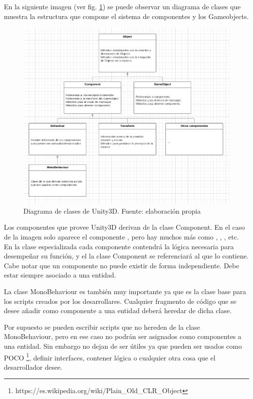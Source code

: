 En la siguiente imagen (ver fig. \ref{diagramaClasesUnity}) se puede observar un diagrama de clases que muestra la estructura que compone el sistema de componentes y los Gameobjects.

\begin{figure}
\begin{center}
\includegraphics[scale=0.8]{imagenes/diagramaClasesUnity.png}
\caption{Diagrama de clases de Unity3D.  Fuente: elaboración propia}
\label{diagramaClasesUnity}
\end{center}
\end{figure}

Los componentes que provee Unity3D derivan de la clase Component. En el caso de la imagen solo aparece el componente , pero hay muchos más como , , , etc. En la clase especializada cada componente contendrá la lógica necesaria para desempeñar su función, y el la clase Component se referenciará al  que lo contiene. Cabe notar que un componente no puede existir de forma independiente. Debe estar siempre asociado a una entidad.

La clase MonoBehaviour es también muy importante ya que es la clase base para los scripts creados por los desarrollares. Cualquier fragmento de código que se desee añadir como componente a una entidad deberá heredar de dicha clase. 

Por supuesto se pueden escribir scripts que no hereden de la clase MonoBehaviour, pero en ese caso no podrán ser asignados como componentes a una entidad. Sin embargo no dejan de ser útiles ya que pueden ser usados como POCO \footnote{https://es.wikipedia.org/wiki/Plain\_Old\_CLR\_Object}, definir interfaces, contener lógica o cualquier otra cosa que el desarrollador desee. 

